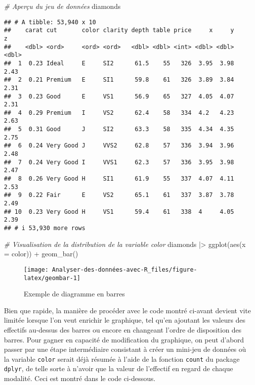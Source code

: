 \documentclass[
]{book}
\newenvironment{Shaded}{\begin{snugshade}}{\end{snugshade}}
\newcommand{\AttributeTok}[1]{\textcolor[rgb]{0.77,0.63,0.00}{#1}}
\newcommand{\CommentTok}[1]{\textcolor[rgb]{0.56,0.35,0.01}{\textit{#1}}}
\newcommand{\FunctionTok}[1]{\textcolor[rgb]{0.00,0.00,0.00}{#1}}
\newcommand{\NormalTok}[1]{#1}
\newcommand{\SpecialCharTok}[1]{\textcolor[rgb]{0.00,0.00,0.00}{#1}}
\begin{document}
\begin{Shaded}
\begin{Highlighting}[]
\CommentTok{\# Aperçu du jeu de données}
\NormalTok{diamonds}
\end{Highlighting}
\end{Shaded}

\begin{verbatim}
## # A tibble: 53,940 x 10
##    carat cut       color clarity depth table price     x     y     z
##    <dbl> <ord>     <ord> <ord>   <dbl> <dbl> <int> <dbl> <dbl> <dbl>
##  1  0.23 Ideal     E     SI2      61.5    55   326  3.95  3.98  2.43
##  2  0.21 Premium   E     SI1      59.8    61   326  3.89  3.84  2.31
##  3  0.23 Good      E     VS1      56.9    65   327  4.05  4.07  2.31
##  4  0.29 Premium   I     VS2      62.4    58   334  4.2   4.23  2.63
##  5  0.31 Good      J     SI2      63.3    58   335  4.34  4.35  2.75
##  6  0.24 Very Good J     VVS2     62.8    57   336  3.94  3.96  2.48
##  7  0.24 Very Good I     VVS1     62.3    57   336  3.95  3.98  2.47
##  8  0.26 Very Good H     SI1      61.9    55   337  4.07  4.11  2.53
##  9  0.22 Fair      E     VS2      65.1    61   337  3.87  3.78  2.49
## 10  0.23 Very Good H     VS1      59.4    61   338  4     4.05  2.39
## # i 53,930 more rows
\end{verbatim}

\begin{Shaded}
\begin{Highlighting}[]
\CommentTok{\# Visualisation de la distribution de la variable color}
\NormalTok{diamonds }\SpecialCharTok{|\textgreater{}} 
  \FunctionTok{ggplot}\NormalTok{(}\FunctionTok{aes}\NormalTok{(}\AttributeTok{x =}\NormalTok{ color)) }\SpecialCharTok{+} 
    \FunctionTok{geom\_bar}\NormalTok{()}
\end{Highlighting}
\end{Shaded}

\begin{figure}

{\centering \texttt{[image: Analyser-des-données-avec-R\_files/figure-latex/geombar-1]} 

}

\caption{Exemple de diagramme en barres}\label{fig:geombar}
\end{figure}

Bien que rapide, la manière de procéder avec le code montré ci-avant devient vite limitée lorsque l'on veut enrichir le graphique, tel qu'en ajoutant les valeurs des effectifs au-dessus des barres ou encore en changeant l'ordre de disposition des barres. Pour gagner en capacité de modification du graphique, on peut d'abord passer par une étape intermédiaire consistant à créer un mini-jeu de données où la variable \texttt{color} serait déjà résumée à l'aide de la fonction \texttt{count} du package \texttt{dplyr}, de telle sorte à n'avoir que la valeur de l'effectif en regard de chaque modalité. Ceci est montré dans le code ci-dessous.
\end{document}
